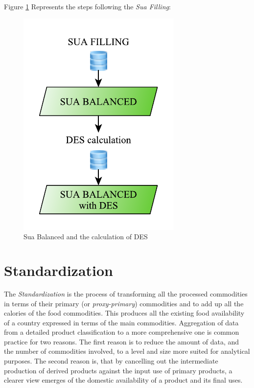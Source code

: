 \documentclass[]{article}
\begin{document}
Figure \ref{fig:f8} Represents the steps following the \emph{Sua
Filling}:

\begin{figure}[H]

{\centering \includegraphics{images/StandBal/08_SuaBalanced} 

}

\caption{\label{fig:f8}Sua Balanced and the calculation of DES}\label{fig:f8}
\end{figure}

\section{Standardization}\label{standardization}

The \emph{Standardization} is the process of transforming all the
processed commodities in terms of their primary (or
\emph{proxy-primary}) commodities and to add up all the calories of the
food commodities. This produces all the existing food availability of a
country expressed in terms of the main commodities. Aggregation of data
from a detailed product classification to a more comprehensive one is
common practice for two reasons. The first reason is to reduce the
amount of data, and the number of commodities involved, to a level and
size more suited for analytical purposes. The second reason is, that by
cancelling out the intermediate production of derived products against
the input use of primary products, a clearer view emerges of the
domestic availability of a product and its final uses.
\end{document}
